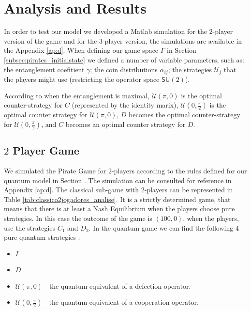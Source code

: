 \section{Analysis and Results}
\label{sec:description_3}


In order to test our model we developed a Matlab simulation for the $2$-player version of the game and for the $3$-player version, the simulations are available in the Appendix \ref{ap:d}. When defining our game space $\Gamma$ in Section \ref{subsec:pirates_initialstate} we defined a number of variable parameters, such as: the entanglement coefitient $\gamma$; the coin distributions $\alpha_{ij}$; the strategies $\mathcal{U}_{j}$ that the players might use (restricting the operator space $\mathsf{SU}(2)$).

According to \cite{Du} when the entanglement is maximal, $\mathcal{U}(\pi, 0)$ is the optimal counter-strategy for $C$ (represented by the identity marix), $\mathcal{U}(0, \frac{\pi}{2})$ is the optimal counter strategy for $\mathcal{U}(\pi, 0)$, $D$ becomes the optimal counter-strategy for $\mathcal{U}(0, \frac{\pi}{2})$, and $C$ becomes an optimal counter strategy for $D$. 

\subsection{$2$ Player Game}
\label{subsec:2playergame}

We simulated the Pirate Game for $2$-players according to the rules defined for our quantum model in Section . The simulation can be consulted for reference in Appendix \ref{ap:d}. The classical sub-game with $2$-players can be represented in Table \ref{tab:classico2jogadores_analise}. It is a strictly determined game, that means that there is at least a Nash Equilibrium when the players choose pure strategies\cite{Leyton-Brown2008:Essentials_Game_Theory}. In this case the outcome of the game is $(100, 0)$, when the players, use the strategies $C_{1}$ and $D_{2}$.  In the quantum game we can find the following $4$ pure quantum strategies :

\begin{itemize}

\item $I$

\item $D$

\item $\mathcal{U}( \pi, 0)$ - the quantum equivalent of a defection operator.

\item $\mathcal{U}( 0, \frac{\pi}{2})$ - the quantum equivalent of a cooperation operator.

\end{itemize}

